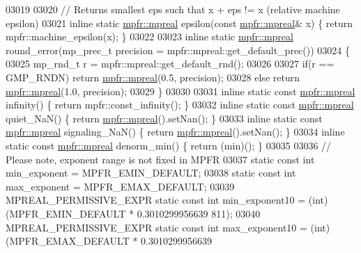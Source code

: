 \begin{DoxyCode}
{{{03019 
03020         \textcolor{comment}{// Returns smallest eps such that x + eps != x (relative machine epsilon)}
03021         \textcolor{keyword}{inline} \textcolor{keyword}{static} \hyperlink{classmpfr_1_1mpreal}{mpfr::mpreal} epsilon(\textcolor{keyword}{const} \hyperlink{classmpfr_1_1mpreal}{mpfr::mpreal}& x) \{  \textcolor{keywordflow}{return} 
      mpfr::machine\_epsilon(x);  \}
03022 
03023         \textcolor{keyword}{inline} \textcolor{keyword}{static} \hyperlink{classmpfr_1_1mpreal}{mpfr::mpreal} round\_error(mp\_prec\_t precision = 
      mpfr::mpreal::get\_default\_prec())
03024         \{
03025             mp\_rnd\_t r = mpfr::mpreal::get\_default\_rnd();
03026 
03027             \textcolor{keywordflow}{if}(r == GMP\_RNDN)  \textcolor{keywordflow}{return} \hyperlink{classmpfr_1_1mpreal}{mpfr::mpreal}(0.5, precision);
03028             \textcolor{keywordflow}{else}               \textcolor{keywordflow}{return} \hyperlink{classmpfr_1_1mpreal}{mpfr::mpreal}(1.0, precision);
03029         \}
03030 
03031         \textcolor{keyword}{inline} \textcolor{keyword}{static} \textcolor{keyword}{const} \hyperlink{classmpfr_1_1mpreal}{mpfr::mpreal} infinity()         \{ \textcolor{keywordflow}{return} mpfr::const\_infinity();   
        \}
03032         \textcolor{keyword}{inline} \textcolor{keyword}{static} \textcolor{keyword}{const} \hyperlink{classmpfr_1_1mpreal}{mpfr::mpreal} quiet\_NaN()        \{ \textcolor{keywordflow}{return} 
      \hyperlink{classmpfr_1_1mpreal}{mpfr::mpreal}().setNan();    \}
03033         \textcolor{keyword}{inline} \textcolor{keyword}{static} \textcolor{keyword}{const} \hyperlink{classmpfr_1_1mpreal}{mpfr::mpreal} signaling\_NaN()    \{ \textcolor{keywordflow}{return} 
      \hyperlink{classmpfr_1_1mpreal}{mpfr::mpreal}().setNan();    \}
03034         \textcolor{keyword}{inline} \textcolor{keyword}{static} \textcolor{keyword}{const} \hyperlink{classmpfr_1_1mpreal}{mpfr::mpreal} denorm\_min()       \{ \textcolor{keywordflow}{return} (min)();                  
        \}
03035 
03036         \textcolor{comment}{// Please note, exponent range is not fixed in MPFR}
03037         \textcolor{keyword}{static} \textcolor{keyword}{const} \textcolor{keywordtype}{int} min\_exponent = MPFR\_EMIN\_DEFAULT;
03038         \textcolor{keyword}{static} \textcolor{keyword}{const} \textcolor{keywordtype}{int} max\_exponent = MPFR\_EMAX\_DEFAULT;
03039         MPREAL\_PERMISSIVE\_EXPR \textcolor{keyword}{static} \textcolor{keyword}{const} \textcolor{keywordtype}{int} min\_exponent10 = (int) (MPFR\_EMIN\_DEFAULT * 0.3010299956639
      811);
03040         MPREAL\_PERMISSIVE\_EXPR \textcolor{keyword}{static} \textcolor{keyword}{const} \textcolor{keywordtype}{int} max\_exponent10 = (int) (MPFR\_EMAX\_DEFAULT * 0.3010299956639
}}}
\end{DoxyCode}
